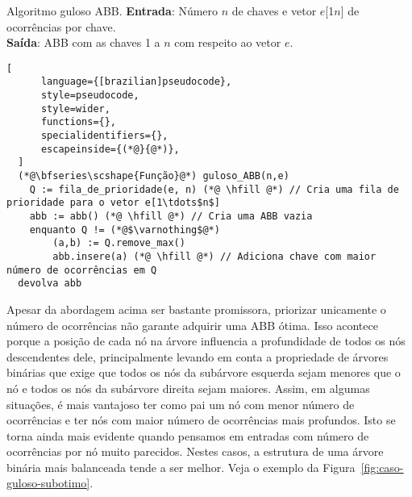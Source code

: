\begin{programruledcaption}{Algoritmo guloso ABB.\label{prog:abb-gulosa}}
  \noindent\textbf{Entrada}: Número $n$ de chaves e vetor $e$[1\tdots$n$] de ocorrências por chave. \\
  \textbf{Saída}: ABB com as chaves 1 a $n$ com respeito ao vetor $e$.
  \vspace{-0.5\baselineskip}
  \begin{lstlisting}[
      language={[brazilian]pseudocode},
      style=pseudocode,
      style=wider,
      functions={},
      specialidentifiers={},
      escapeinside={(*@}{@*)},
  ]
  (*@\bfseries\scshape{Função}@*) guloso_ABB(n,e)
    Q := fila_de_prioridade(e, n) (*@ \hfill @*) // Cria uma fila de prioridade para o vetor e[1\tdots$n$]
    abb := abb() (*@ \hfill @*) // Cria uma ABB vazia
    enquanto Q != (*@$\varnothing$@*) 
        (a,b) := Q.remove_max()
        abb.insere(a) (*@ \hfill @*) // Adiciona chave com maior número de ocorrências em Q
  devolva abb
  \end{lstlisting}
  \vspace{-0.5\baselineskip}
\end{programruledcaption}

Apesar da abordagem acima ser bastante promissora, priorizar unicamente o número de ocorrências não garante adquirir uma ABB ótima. Isso acontece porque a posição de cada nó na árvore influencia a profundidade de todos os nós descendentes dele, principalmente levando em conta a propriedade de árvores binárias que exige que todos os nós da subárvore esquerda sejam menores que o nó e todos os nós da subárvore direita sejam maiores. Assim, em algumas situações, é mais vantajoso ter como pai um nó com menor número de ocorrências e ter nós com maior número de ocorrências mais profundos. Isto se torna ainda mais evidente quando pensamos em entradas com número de ocorrências por nó muito parecidos. Nestes casos, a estrutura de uma árvore binária mais balanceada tende a ser melhor. Veja o exemplo da Figura~\ref{fig:caso-guloso-subotimo}.


